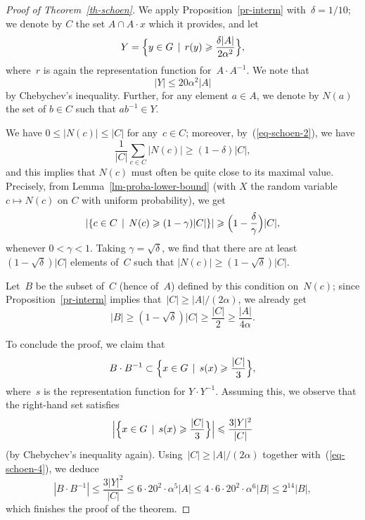 \documentclass[12pt]{amsart}
\renewcommand{\leq}{\leqslant}
\renewcommand{\geq}{\geqslant}
\numberwithin{equation}{section}
\theoremstyle{plain}
\theoremstyle{remark}
\theoremstyle{definition}
\renewcommand{\geq}{\geqslant}
\renewcommand{\leq}{\leqslant}
\begin{document}
\begin{proof}[Proof of Theorem~\ref{th-schoen}]
  We apply Proposition~\ref{pr-interm} with~$\delta=1/10$; we denote by
  $C$ the set $A\cap A\cdot x$ which it provides, and let
  $$
  Y=\Bigl\{y\in G\,\mid\, r(y)\geq \frac{\delta|A|}{2\alpha^2}\Bigr\},
  $$
  where~$r$ is again the representation function for~$A\cdot A^{-1}$. We
  note that
  \begin{equation}\label{eq-schoen-4}
    |Y|\leq 20\alpha^2|A|
  \end{equation}
  by Chebychev's inequality.  Further, for any element $a\in A$, we
  denote by $N(a)$ the set of $b\in C$ such that $ab^{-1}\in Y$.

  We have $0\leq |N(c)|\leq |C|$ for any~$c\in C$; moreover,
  by~(\ref{eq-schoen-2}), we have
  $$
  \frac{1}{|C|} \sum_{c\in C}|N(c)|\geq (1-\delta)|C|,
  $$
  and this implies that $N(c)$ must often be quite close to its maximal
  value. Precisely, from Lemma~\ref{lm-proba-lower-bound} (with $X$ the
  random variable $c\mapsto N(c)$ on $C$ with uniform probability), we
  get
  $$
  |\{c\in C\,\mid\, N(c)\geq (1-\gamma )|C|\}|\geq
  \Bigl(1-\frac{\delta}{\gamma}\Bigr) |C|,
  $$
  whenever $0<\gamma<1$.  
  Taking $\gamma=\sqrt{\delta}$, we find that there are at least
  $(1-\sqrt{\delta})|C|$ elements of~$C$ such that
  $|N(c)|\geq (1-\sqrt{\delta})|C|$.

  Let~$B$ be the subset of~$C$ (hence of~$A$) defined by this condition
  on~$N(c)$; since Proposition~\ref{pr-interm} implies
  that~$|C|\geq |A|/(2\alpha)$, we already get
  $$
  |B|\geq (1-\sqrt{\delta})|C|\geq \frac{|C|}{2}\geq
  \frac{|A|}{4\alpha}.
  $$

  To conclude the proof, we claim that
  \begin{equation}\label{eq-schoen-5}
    B\cdot B^{-1}\subset \Bigl\{x\in G\,\mid\, s(x)\geq \frac{|C|}{3}\Bigr\},
  \end{equation}
  where~$s$ is the representation function for $Y\cdot Y^{-1}$. Assuming
  this, we observe that the right-hand set satisfies
  $$
  \Bigl|\Bigl\{
  x\in G\,\mid\, s(x)\geq \frac{|C|}{3}
  \Bigr\}\Bigr|
  \leq
  \frac{3|Y|^2}{|C|}
  $$ 
  (by Chebychev's inequality again).
  Using~$|C|\geq |A|/(2\alpha)$ together with~(\ref{eq-schoen-4}), we
  deduce
  $$
  |B\cdot B^{-1}|\leq \frac{3|Y|^2}{|C|}\leq 6\cdot 20^2\cdot
  \alpha^5|A|\leq 4\cdot 6\cdot 20^2\cdot \alpha^6|B|\leq 2^{14}|B|,
  $$
  which finishes the proof of the theorem.


\end{proof}
\end{document}
